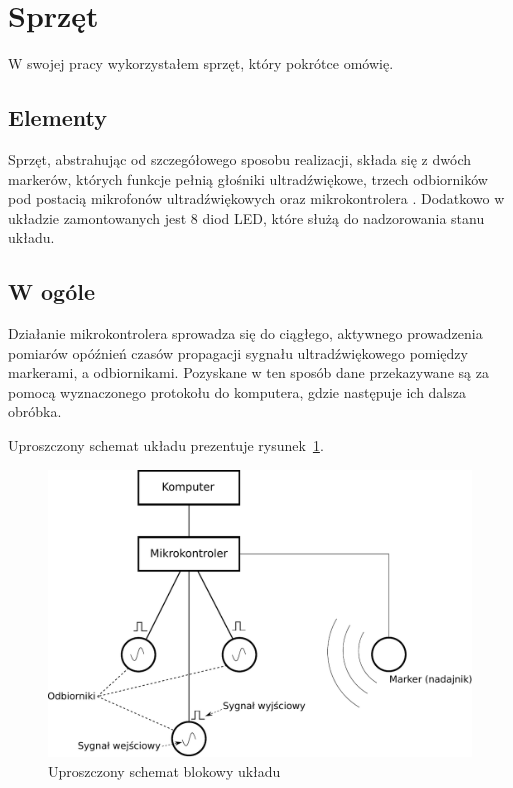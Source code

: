 \label{ch:solution} %

\section{Sprzęt}
W swojej pracy wykorzystałem sprzęt, który pokrótce omówię.

\subsection{Elementy}
Sprzęt, abstrahując od szczegółowego sposobu realizacji, składa się z dwóch markerów, których funkcje pełnią głośniki ultradźwiękowe, trzech odbiorników pod postacią mikrofonów ultradźwiękowych oraz mikrokontrolera . Dodatkowo w układzie zamontowanych jest 8 diod LED, które służą do nadzorowania stanu układu.

\subsection{W ogóle}
Działanie mikrokontrolera sprowadza się do ciągłego, aktywnego prowadzenia pomiarów opóźnień czasów propagacji sygnału ultradźwiękowego pomiędzy markerami, a odbiornikami. Pozyskane w ten sposób dane przekazywane są za pomocą wyznaczonego protokołu do komputera, gdzie następuje ich dalsza obróbka.

Uproszczony schemat układu prezentuje rysunek~\ref{fig:device_scheme}.

\begin{figure}
 \includegraphics[width=\textwidth]{gfx/diagramy/schemat_blokowy_ukladu}
 \caption{Uproszczony schemat blokowy układu}
 \label{fig:device_scheme}
\end{figure}

